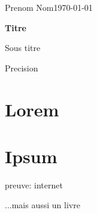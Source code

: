 \documentclass[12pt]{article}
\newcommand{\nomEntier}{Prenom Nom} %
\newcommand{\dateRendu}{\today} %
\newcommand{\titreDoc}{Titre} %
\newcommand{\sousTitreDoc}{Sous titre} %
\newcommand{\sousSousTitreDoc}{Precision} %
\begin{document}
\begin{titlepage}
    \nomEntier \hfill \dateRendu
    \begin{center}
        \vspace*{7cm}
        
        \Huge
        \textbf{\titreDoc}
 
        \vspace{0.5cm}
        \LARGE
        \sousTitreDoc

        \vspace{0.5cm}
        \large
        \sousSousTitreDoc
    \end{center}
 \end{titlepage}
 \thispagestyle{fancy}
\newpage



\tableofcontents
\newpage

\section{Lorem}
\lipsum
\section{Ipsum}
\lipsum

\cite{WEBSITE:1}{preuve: internet}


\cite{BOOK:1}{...mais aussi un livre}

\printbibliography
\end{document}

